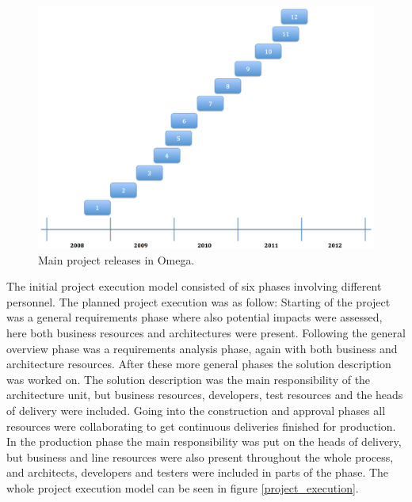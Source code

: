\begin{figure}[H]
\centering
\includegraphics[trim = 8mm 0mm 0mm 0mm,width=160mm]{images/project_releases}
\caption{Main project releases in Omega.}
\label{releases}
\end{figure}

The initial project execution model consisted of six phases involving different personnel. The planned project execution was as follow: Starting of the project was a general requirements phase where also potential impacts were assessed, here both business resources and architectures were present. Following the general overview phase was a requirements analysis phase, again with both business and architecture resources. After these more general phases the solution description was worked on. The solution description was the main responsibility of the architecture unit, but business resources, developers, test resources and the heads of delivery were included. Going into the construction and approval phases all resources were collaborating to get continuous deliveries finished for production. In the production phase the main responsibility was put on the heads of delivery, but business and line resources were also present throughout the whole process, and architects, developers and testers were included in parts of the phase. The whole project execution model can be seen in figure \ref{project_execution}.


